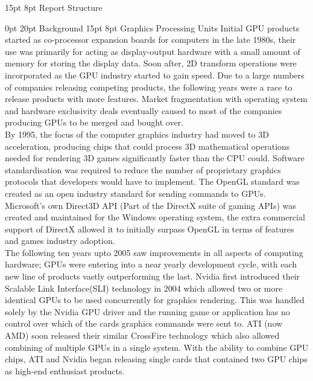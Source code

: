 \documentclass[12pt,a4paper]{article}
\makeatletter
\renewcommand\subsection{\@startsection {subsection}{1}{2mm} %
                               {15pt} %
                               {8pt} %
                               {\fontsize{13pt}{1em}\bfseries}}
\renewcommand\section{\@startsection {section}{1}{0mm} %
                               {0pt} %
                               {20pt} %
                               {\fontsize{14pt}{1em}\bfseries\newpage}}
\makeatother
\begin{document}
\subsection{Report Structure}
	\lipsum[6]
		
\section{Background}
\subsection{Graphics Processing Units}
Initial GPU products started as co-processor expansion boards for computers in the late 1980s, their use was primarily for acting as display-output hardware with a small amount of memory for storing the display data. Soon after, 2D transform operations were incorporated as the GPU industry started to gain speed. Due to a large numbers of companies releasing competing products, the following years were a race to release products with more features. Market fragmentation with operating system and hardware exclusivity deals eventually caused to most of the companies producing GPUs to be merged and bought over.
\\
By 1995, the focus of the computer graphics industry had moved to 3D acceleration, producing chips that could process 3D mathematical operations needed for rendering 3D games significantly faster than the CPU could. Software standardisation was required to reduce the number of proprietary graphics protocols that developers would have to implement. The OpenGL standard was created as an open industry standard for sending commands to GPUs. Microsoft's own Direct3D API (Part of the DirectX suite of gaming APIs) was created and maintained for the Windows operating system, the extra commercial support of DirectX allowed it to initially surpass OpenGL in terms of features and games industry adoption. 
\\
The following ten years upto 2005 saw improvements in all aspects of computing hardware; GPUs were entering into a near yearly development cycle, with each new line of products vastly outperforming the last. Nvidia first introduced their Scalable Link Interface(SLI) technology in 2004 which allowed two or more identical GPUs to be used concurrently for graphics rendering. This was handled solely by the Nvidia GPU driver and the running game or application has no control over which of the cards graphics commands were sent to. ATI (now AMD) soon released their similar CrossFire technology which also allowed combining of multiple GPUs in a single system. With the ability to combine GPU chips, ATI and Nvidia began releasing single cards that contained two GPU chips as high-end enthusiast products.
\end{document}
